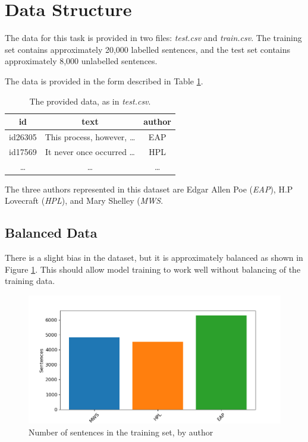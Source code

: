 \section{Data Structure}
\label{sec:data_structure}
The data for this task is provided in two files: \textit{test.csv} and \textit{train.csv}. The training set contains approximately 20,000 labelled sentences, and the test set contains approximately 8,000 unlabelled sentences.

The data is provided in the form described in Table \ref{tab:data_form}.

\begin{table}[h]
\centering
\begin{tabular}{|c|c|c|}
\hline 
\textbf{id} & \textbf{text} & \textbf{author} \\ 
\hline 
id26305 & This process, however, \ldots & EAP \\ 
\hline 
id17569 & It never once occurred \ldots & HPL \\ 
\hline 
\ldots & \ldots & \ldots \\ 
\hline 
\end{tabular} 
\caption{The provided data, as in \textit{test.csv}.}
\label{tab:data_form}
\end{table}
The three authors represented in this dataset are Edgar Allen Poe (\textit{EAP}), H.P Lovecraft (\textit{HPL}), and Mary Shelley (\textit{MWS}.

\subsection{Balanced Data}
\label{sec:balanced_data}

There is a slight bias in the dataset, but it is approximately balanced as shown in Figure \ref{fig:balance}. This should allow model training to work well without balancing of the training data.

\begin{figure}[h]
\centering
\includegraphics[width=\columnwidth]{Figures/Data_Structure/balance.png}
\caption{Number of sentences in the training set, by author}
\label{fig:balance}
\end{figure}

